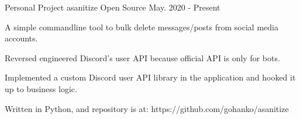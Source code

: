 \begin{cventries}
  \cventry
    {Personal Project} %
    {asanitize} %
    {Open Source} %
    {May. 2020 - Present} %
    {
      \begin{cvitems} %
          \item {A simple commandline tool to bulk delete messages/posts from social media accounts.}
          \item {Reversed engineered Discord's user API because official API is only for bots.}
          \item {Implemented a custom Discord user API library in the application and hooked it up to business logic.}
          \item {Written in Python, and repository is at: https://github.com/gohanko/asanitize}
      \end{cvitems}
    }

\end{cventries}